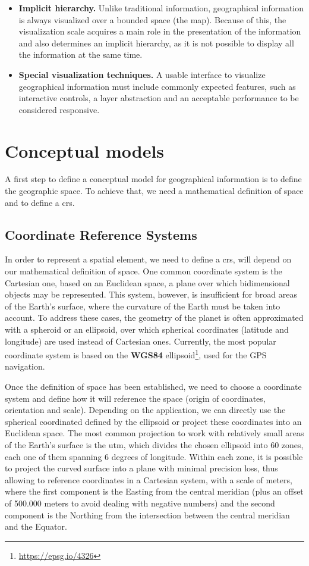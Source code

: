 \begin{itemize}
        \item \textbf{Implicit hierarchy.} Unlike traditional information, geographical information is always visualized over a bounded space (the map). Because of this, the visualization scale acquires a main role in the presentation of the information and also determines an implicit hierarchy, as it is not possible to display all the information at the same time.
        
        \item \textbf{Special visualization techniques.} A usable interface to visualize geographical information must include commonly expected features, such as interactive controls, a layer abstraction and an acceptable performance to be considered responsive.
    \end{itemize}
    
    \section{Conceptual models}
    \label{gis:concept}
    A first step to define a conceptual model for geographical information is to define the geographic space. To achieve that, we need a mathematical definition of space and to define a \gls{crs}.
    
    \subsection{Coordinate Reference Systems}
    In order to represent a spatial element, we need to define a \gls{crs}, will depend on our mathematical definition of space. One common coordinate system is the Cartesian one, based on an Euclidean space, a plane over which bidimensional objects may be represented. This system, however, is insufficient for broad areas of the Earth's surface, where the curvature of the Earth must be taken into account. To address these cases, the geometry of the planet is often approximated with a spheroid or an ellipsoid, over which spherical coordinates (latitude and longitude) are used instead of Cartesian ones. Currently, the most popular coordinate system is based on the \textbf{WGS84} ellipsoid\footnote{\url{https://epsg.io/4326}}, used for the GPS navigation.
    
    Once the definition of space has been established, we need to choose a coordinate system and define how it will reference the space (origin of coordinates, orientation and scale). Depending on the application, we can directly use the spherical coordinated defined by the ellipsoid or project these coordinates into an Euclidean space. The most common projection to work with relatively small areas of the Earth's surface is the \gls{utm}, which divides the chosen ellipsoid into 60 zones, each one of them spanning 6 degrees of longitude. Within each zone, it is possible to project the curved surface into a plane with minimal precision loss, thus allowing to reference coordinates in a Cartesian system, with a scale of meters, where the first component is the Easting from the central meridian (plus an offset of 500.000 meters to avoid dealing with negative numbers) and the second component is the Northing from the intersection between the central meridian and the Equator.
    

